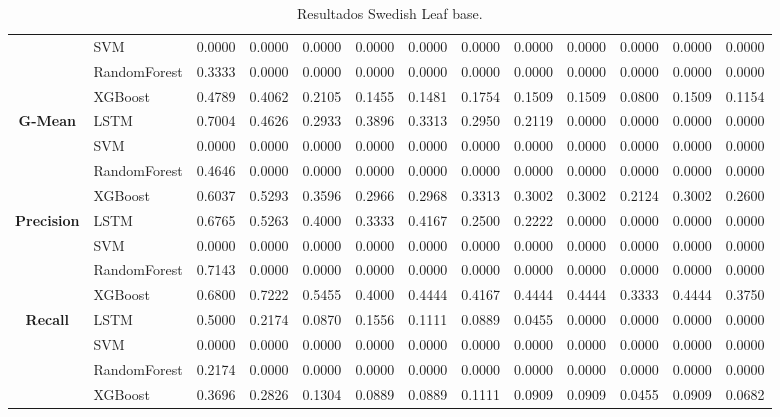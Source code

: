 \begin{table}[h]
\begin{adjustbox}{max width=15cm}
\begin{tabular}{|c|l|r|r|r|r|r|r|r|r|r|r|r|}
		& SVM &  0.0000 &  0.0000 &  0.0000 &  0.0000 &  0.0000 &  0.0000 &  0.0000 &  0.0000 &  0.0000 &  0.0000 &  0.0000 \\
		& RandomForest &  0.3333 &  0.0000 &  0.0000 &  0.0000 &  0.0000 &  0.0000 &  0.0000 &  0.0000 &  0.0000 &  0.0000 &  0.0000 \\
		& XGBoost &  0.4789 &  0.4062 &  0.2105 &  0.1455 &  0.1481 &  0.1754 &  0.1509 &  0.1509 &  0.0800 &  0.1509 &  0.1154 \\
		\hline
		\textbf{G-Mean} & LSTM &  0.7004 &  0.4626 &  0.2933 &  0.3896 &  0.3313 &  0.2950 &  0.2119 &  0.0000 &  0.0000 &  0.0000 &  0.0000 \\
		& SVM &  0.0000 &  0.0000 &  0.0000 &  0.0000 &  0.0000 &  0.0000 &  0.0000 &  0.0000 &  0.0000 &  0.0000 &  0.0000 \\
		& RandomForest &  0.4646 &  0.0000 &  0.0000 &  0.0000 &  0.0000 &  0.0000 &  0.0000 &  0.0000 &  0.0000 &  0.0000 &  0.0000 \\
		& XGBoost &  0.6037 &  0.5293 &  0.3596 &  0.2966 &  0.2968 &  0.3313 &  0.3002 &  0.3002 &  0.2124 &  0.3002 &  0.2600 \\
		\hline
		\textbf{Precision} & LSTM &  0.6765 &  0.5263 &  0.4000 &  0.3333 &  0.4167 &  0.2500 &  0.2222 &  0.0000 &  0.0000 &  0.0000 &  0.0000 \\
		& SVM &  0.0000 &  0.0000 &  0.0000 &  0.0000 &  0.0000 &  0.0000 &  0.0000 &  0.0000 &  0.0000 &  0.0000 &  0.0000 \\
		& RandomForest &  0.7143 &  0.0000 &  0.0000 &  0.0000 &  0.0000 &  0.0000 &  0.0000 &  0.0000 &  0.0000 &  0.0000 &  0.0000 \\
		& XGBoost &  0.6800 &  0.7222 &  0.5455 &  0.4000 &  0.4444 &  0.4167 &  0.4444 &  0.4444 &  0.3333 &  0.4444 &  0.3750 \\
		\hline
		\textbf{Recall} & LSTM &  0.5000 &  0.2174 &  0.0870 &  0.1556 &  0.1111 &  0.0889 &  0.0455 &  0.0000 &  0.0000 &  0.0000 &  0.0000 \\
		& SVM &  0.0000 &  0.0000 &  0.0000 &  0.0000 &  0.0000 &  0.0000 &  0.0000 &  0.0000 &  0.0000 &  0.0000 &  0.0000 \\
		& RandomForest &  0.2174 &  0.0000 &  0.0000 &  0.0000 &  0.0000 &  0.0000 &  0.0000 &  0.0000 &  0.0000 &  0.0000 &  0.0000 \\
		& XGBoost &  0.3696 &  0.2826 &  0.1304 &  0.0889 &  0.0889 &  0.1111 &  0.0909 &  0.0909 &  0.0455 &  0.0909 &  0.0682 \\
		\hline
	\end{tabular}
\end{adjustbox}
\caption{Resultados Swedish Leaf base.}
\label{tab:SLeaf_base}
\end{table}
